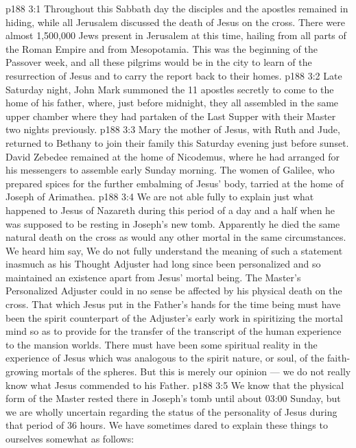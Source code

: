 \vs p188 3:1 Throughout this Sabbath day the disciples and the apostles remained in hiding, while all Jerusalem discussed the death of Jesus on the cross. There were almost 1,500,000 Jews present in Jerusalem at this time, hailing from all parts of the Roman Empire and from Mesopotamia. This was the beginning of the Passover week, and all these pilgrims would be in the city to learn of the resurrection of Jesus and to carry the report back to their homes.
\vs p188 3:2 Late Saturday night, John Mark summoned the 11 apostles secretly to come to the home of his father, where, just before midnight, they all assembled in the same upper chamber where they had partaken of the Last Supper with their Master two nights previously.
\vs p188 3:3 Mary the mother of Jesus, with Ruth and Jude, returned to Bethany to join their family this Saturday evening just before sunset. David Zebedee remained at the home of Nicodemus, where he had arranged for his messengers to assemble early Sunday morning. The women of Galilee, who prepared spices for the further embalming of Jesus’ body, tarried at the home of Joseph of Arimathea.
\vs p188 3:4 \pc We are not able fully to explain just what happened to Jesus of Nazareth during this period of a day and a half when he was supposed to be resting in Joseph’s new tomb. Apparently he died the same natural death on the cross as would any other mortal in the same circumstances. We heard him say,  We do not fully understand the meaning of such a statement inasmuch as his Thought Adjuster had long since been personalized and so maintained an existence apart from Jesus’ mortal being. The Master’s Personalized Adjuster could in no sense be affected by his physical death on the cross. That which Jesus put in the Father’s hands for the time being must have been the spirit counterpart of the Adjuster’s early work in spiritizing the mortal mind so as to provide for the transfer of the transcript of the human experience to the mansion worlds. There must have been some spiritual reality in the experience of Jesus which was analogous to the spirit nature, or soul, of the faith\hyp{}growing mortals of the spheres. But this is merely our opinion --- we do not really know what Jesus commended to his Father.
\vs p188 3:5 We know that the physical form of the Master rested there in Joseph’s tomb until about 03:00 Sunday, but we are wholly uncertain regarding the status of the personality of Jesus during that period of 36 hours. We have sometimes dared to explain these things to ourselves somewhat as follows:
